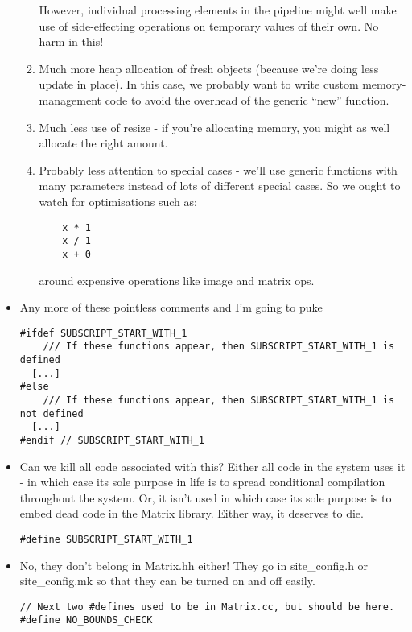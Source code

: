 \begin{itemize}
\begin{enumerate}
  However, individual processing elements in the pipeline might well
  make use of side-effecting operations on temporary values of their
  own.  No harm in this!
  
\item
  Much more heap allocation of fresh objects (because we're doing less
  update in place).  In this case, we probably want to write custom
  memory-management code to avoid the overhead of the generic ``new''
  function.

\item
  Much less use of resize - if you're allocating memory, you might as
  well allocate the right amount.

\item
  Probably less attention to special cases - we'll use generic functions
  with many parameters instead of lots of different special cases.
  So we ought to watch for optimisations such as:

\begin{verbatim}
    x * 1
    x / 1
    x + 0
\end{verbatim}

  around expensive operations like image and matrix ops.
\end{enumerate}

\item
Any more of these pointless comments and I'm going to puke
\begin{verbatim}
#ifdef SUBSCRIPT_START_WITH_1  
    /// If these functions appear, then SUBSCRIPT_START_WITH_1 is defined
  [...]
#else
    /// If these functions appear, then SUBSCRIPT_START_WITH_1 is not defined
  [...]
#endif // SUBSCRIPT_START_WITH_1
\end{verbatim}

\item
Can we kill all code associated with this?  Either all code in the
system uses it - in which case its sole purpose in life is to spread
conditional compilation throughout the system.  Or, it isn't used in
which case its sole purpose is to embed dead code in the Matrix
library.  Either way, it deserves to die.
\begin{verbatim}
#define SUBSCRIPT_START_WITH_1
\end{verbatim}

\item
No, they don't belong in Matrix.hh either!
They go in site\_config.h or site\_config.mk so that they
can be turned on and off easily.
\begin{verbatim}
// Next two #defines used to be in Matrix.cc, but should be here.
#define NO_BOUNDS_CHECK
\end{verbatim}


\end{itemize}
